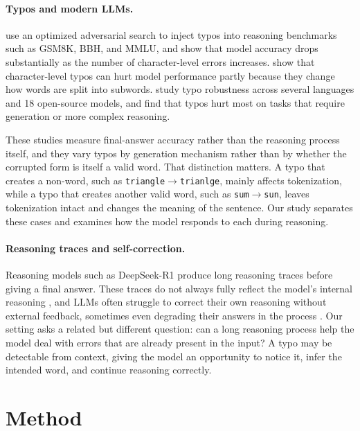 \documentclass[11pt]{article}
\newcommand{\arrow}{$\rightarrow$}
\begin{document}
\paragraph{Typos and modern LLMs.}
\citet{gan2024} use an optimized adversarial search to inject typos into
reasoning benchmarks such as GSM8K, BBH, and MMLU, and show that model accuracy
drops substantially as the number of character-level errors increases.
\citet{chai2024} show that character-level typos can hurt model performance
partly because they change how words are split into subwords.
\citet{zhao2026} study typo robustness across several languages and 18
open-source models, and find that typos hurt most on tasks that require
generation or more complex reasoning.

These studies measure final-answer accuracy rather than the reasoning process
itself, and they vary typos by generation mechanism rather than by whether the
corrupted form is itself a valid word. That distinction matters. A typo that
creates a non-word, such as \texttt{triangle\arrow trianlge}, mainly affects
tokenization, while a typo that creates another valid word, such as
\texttt{sum\arrow sun}, leaves tokenization intact and changes the meaning of
the sentence. Our study separates these cases and examines how the model
responds to each during reasoning.

\paragraph{Reasoning traces and self-correction.}
Reasoning models such as DeepSeek-R1 \citep{deepseekr1} produce long reasoning
traces before giving a final answer. These traces do not always fully reflect
the model's internal reasoning \citep{turpin2023}, and LLMs often struggle to
correct their own reasoning without external feedback, sometimes even degrading
their answers in the process \citep{huang2024}. Our setting asks a related but
different question: can a long reasoning process help the model deal with errors
that are already present in the input? A typo may be detectable from context,
giving the model an opportunity to notice it, infer the intended word, and
continue reasoning correctly.

\section{Method}
\end{document}
